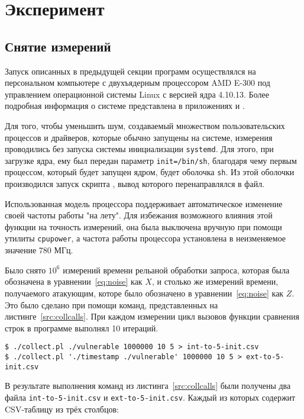 \section{Эксперимент} \label{sec:experiment}

\subsection{Снятие измерений}

Запуск описанных в предыдущей секции программ осуществлялся на персональном компьютере с двухъядерным
процессором AMD E-300 под управлением операционной системы Linux с версией ядра
4.10.13. Более подробная информация о системе представлена в приложениях
 и .

Для того, чтобы уменьшить шум, создаваемый множеством пользовательских процессов
и драйверов, которые обычно запущены на системе, измерения проводились без запуска
системы инициализации \texttt{systemd}. Для этого, при загрузке ядра, ему был
передан параметр \texttt{init=/bin/sh}, благодаря чему первым процессом, который
будет запущен ядром, будет оболочка \texttt{sh}. Из этой оболочки производился
запуск скрипта , вывод которого перенаправлялся в файл.

Использованная модель процессора поддерживает автоматическое изменение своей частоты
работы "на лету". Для избежания возможного влияния этой функции на точность измерений,
она была выключена вручную при помощи утилиты \texttt{cpupower},
а частота работы процессора установлена в неизменяемое значение 780 МГц.

Было снято $10^6$ измерений времени рельаной обработки запроса, которая была обозначена в
уравнении~\ref{eq:noise} как $X$, и столько же измерений времени, получаемого атакующим,
которе было обозначено в уравнении~\ref{eq:noise} как $Z$. Это было сделано при помощи
команд, представленных на листинге~\ref{src:collcalls}. При каждом измерении цикл
вызовов функции сравнения строк в программе  выполнял 10 итераций.

\begin{lstlisting}[caption=Команды снятия измерений, label=src:collcalls]
$ ./collect.pl ./vulnerable 1000000 10 5 > int-to-5-init.csv
$ ./collect.pl './timestamp ./vulnerable' 1000000 10 5 > ext-to-5-init.csv
\end{lstlisting}

В результате выполнения команд из листинга~\ref{src:collcalls} были получены два файла
\texttt{int-to-5-init.csv} и \texttt{ext-to-5-init.csv}. Каждый из которых содержит CSV-таблицу
из трёх столбцов:

